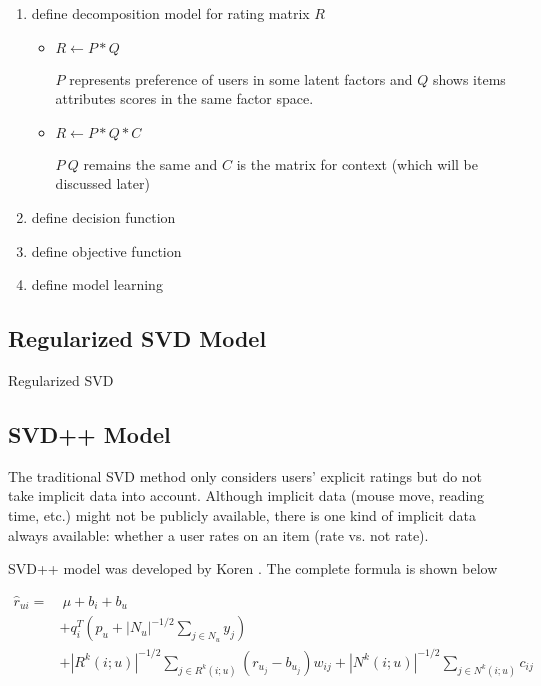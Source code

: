 \documentclass[letter paper, 11pt]{article}
\begin{document}
	\begin{enumerate}
		\item define decomposition model for rating matrix $R$
		
		\begin{itemize}
			\item $ R \leftarrow P * Q $ 
			
			$P$ represents preference of users in some latent factors and $Q$ shows items attributes scores in the same factor space.
			
			\item $ R \leftarrow P * Q * C$
			
			$P\ Q$ remains the same and $C$ is the matrix for context (which will be discussed later)
		\end{itemize}
		

		
		\item define decision function
		
		
		\item define objective function
		
		
		\item define model learning
		
	\end{enumerate}


	\subsection{Regularized SVD Model}

	Regularized SVD 


	\subsection{SVD++ Model}
	
	The traditional SVD method only considers users' explicit ratings but do not take implicit data into account. Although implicit data (mouse move, reading time, etc.) might not be publicly available, there is one kind of implicit data always available: whether a user rates on an item (rate vs. not rate). 
	
	
	SVD++ model was developed by Koren \cite{korenFactorization}. The complete formula is shown below 
	
	\begin{equation} \label{SVD++}
		\begin{split}
			\hat{r}_{ui} =& \ \mu + b_i + b_u \\ 
			& + q_i^T  (p_u + |N_u|^{-1/2} \sum_{j \in N_u}y_j) \\ 
			& + |R^k(i; u)|^{-1/2} \sum_{j \in R^k(i; u)} (r_{u_j} - b_{u_j}) w_{ij} + |N^k(i; u)|^{-1/2} \sum_{j \in N^k(i; u)} c_{ij}
		\end{split}
	\end{equation}
	
\end{document}
